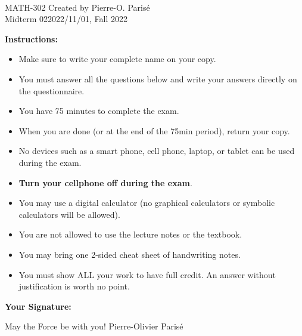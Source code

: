 \documentclass[addpoints, 12pt]{exam}%
\theoremstyle{definition}
\begin{document}
	\noindent \hrulefill \\
	\noindent MATH-302 \hfill Created by Pierre-O. Paris{\'e}\\
	Midterm 02\hfill 2022/11/01, Fall 2022\\\vspace*{-0.7cm}

\noindent\hrulefill
	
\vspace*{1cm}

\noindent{}

\vspace*{1cm}

\vspace*{1cm}

\noindent\textbf{Instructions:} 

\begin{itemize}
\item Make sure to write your complete name on your copy. 
\item You must answer all the questions below and write your answers directly on the questionnaire.
\item You have 75 minutes to complete the exam.
\item When you are done (or at the end of the 75min period), return your copy. 
\item No devices such as a smart phone, cell phone, laptop, or tablet can be used during the exam. 
\item \textbf{Turn your cellphone off during the exam}.
\item You may use a digital calculator (no graphical calculators or symbolic calculators will be allowed).
\item You are not allowed to use the lecture notes or the textbook.
\item You may bring one 2-sided cheat sheet of handwriting notes. 
\item You must show ALL your work to have full credit. An answer without justification is worth no point.
\end{itemize}

\vspace{0.5cm}

\noindent\textbf{Your Signature:} \hrulefill

\vspace*{2cm}
\noindent May the Force be with you! \hfill Pierre-Olivier Parisé
\end{document}
